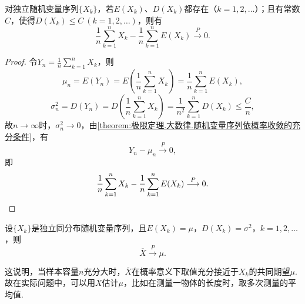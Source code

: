 \begin{theorem}[切比雪夫大数律]\label{theorem:极限定理.大数律.切比雪夫大数律}
对独立随机变量序列\(\{X_k\}\)，若\(E(X_k)\)、\(D(X_k)\)都存在（\(k=1,2,\dotsc\)）；且有常数\(C\)，使得\(D(X_k) \leq C\ (k=1,2,\dotsc)\)，则有\[
\frac{1}{n} \sum\limits_{k=1}^n{X_k} - \frac{1}{n} \sum\limits_{k=1}^n{E(X_k)} \overset{P}{\longrightarrow} 0.
\]
\begin{proof}
\def\Yn{\frac{1}{n} \sum\limits_{k=1}^n{X_k}}
令\(Y_n=\Yn\)，则\[
\mu_n = E(Y_n) = E\left(\Yn\right) = \frac{1}{n} \sum\limits_{k=1}^n{E(X_k)},
\]\[
\sigma_n^2 = D(Y_n) = D\left(\Yn\right) = \frac{1}{n^2} \sum\limits_{k=1}^n{D(X_k)} \leq \frac{C}{n},
\]
故\(n\to\infty\)时，\(\sigma_n^2\to0\)，由\cref{theorem:极限定理.大数律.随机变量序列依概率收敛的充分条件}，有\[
Y_n - \mu_n \overset{P}{\longrightarrow} 0,
\]即\[
\frac{1}{n} \sum\limits_{k=1}^n{X_k} - \frac{1}{n} \sum\limits_{k=1}^n{E(X_k)} \overset{P}{\longrightarrow} 0.
\qedhere
\]
\end{proof}
\end{theorem}

\begin{corollary}[独立同分布大数律]\label{theorem:极限定理.大数律.独立同分布大数律}
设\(\{X_k\}\)是独立同分布随机变量序列，且\(E(X_k)=\mu\)，\(D(X_k)=\sigma^2\)，\(k=1,2,\dotsc\)，则\[
\overline{X} \overset{P}{\longrightarrow} \mu.
\]
\end{corollary}
这说明，当样本容量\(n\)充分大时，\(\overline{X}\)在概率意义下取值充分接近于\(X_k\)的共同期望\(\mu\).
故在实际问题中，可以用\(\overline{X}\)估计\(\mu\)，比如在测量一物体的长度时，取多次测量的平均值.

